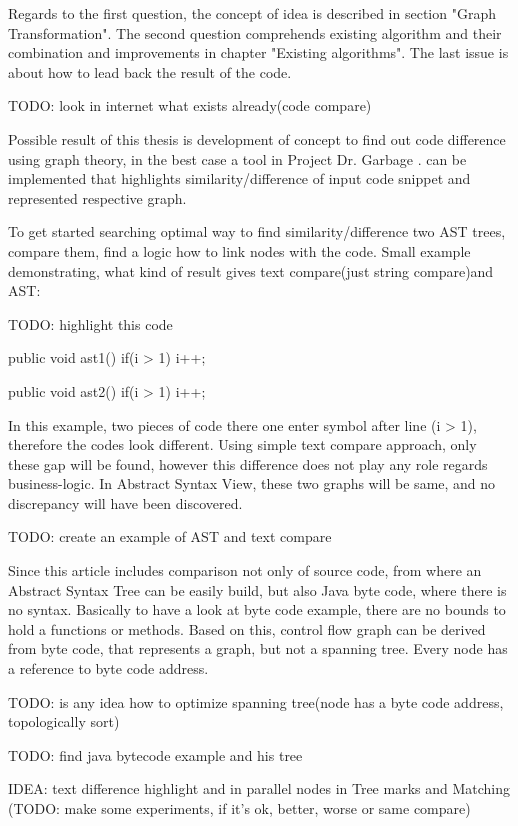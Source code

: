 \documentclass{report}
\begin{document}
Regards to the first question, the concept of idea is described in section "Graph Transformation". The second question comprehends existing algorithm and their combination and improvements in chapter "Existing algorithms". The last issue is about how to lead back the result of the code.

TODO: look in internet what exists already(code compare)

Possible result of this thesis is development of concept to find out code difference using graph theory, in the best case a tool in Project Dr. Garbage \cite{drgarbage} . can be implemented that highlights similarity/difference of input code snippet and represented respective graph.

To get started searching optimal way to find similarity/difference two AST trees, compare them, find a logic how to link nodes with the code. Small example demonstrating, what kind of result gives text compare(just string compare)and AST:

TODO: highlight this code

	public void ast1(){
		if(i > 1) i++;\\
	}
	
	public void ast2(){
		if(i > 1) 
		i++;
	}
	
In this example, two pieces of code there one enter symbol after line (i > 1), therefore the codes look different. Using simple text compare approach, only these gap will be found, however this difference does not play any role regards business-logic. In Abstract Syntax View, these two graphs will be same, and no discrepancy will have been discovered.

TODO: create an example of AST and text compare
	
Since this article includes comparison not only of source code, from where an Abstract Syntax Tree can be easily build, but also Java byte code, where there is no syntax. Basically to have a look at byte code example, there are no bounds to hold a functions or methods. Based on this, 
control flow graph can be derived from byte code, that represents a graph, but not a spanning tree. Every node has a reference to byte code address.

TODO: is any idea how to optimize spanning tree(node has a byte code address, topologically sort)

TODO: find java bytecode example and his tree

IDEA: text difference highlight and in parallel nodes in Tree marks and Matching
(TODO: make some experiments, if it's ok, better, worse or same compare)
\end{document}
